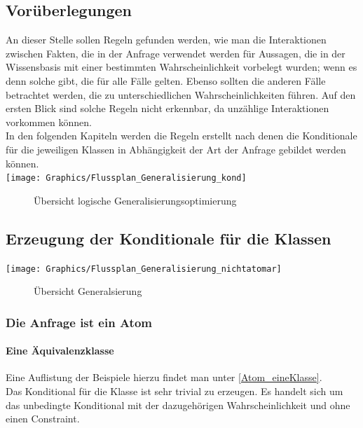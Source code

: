 \documentclass[a4paper, 11pt]{book}
\begin{document}
\subsection{Vorüberlegungen}
An dieser Stelle sollen Regeln gefunden werden, wie man die Interaktionen zwischen Fakten, die in der Anfrage verwendet werden für Aussagen, die in der Wissensbasis mit einer bestimmten Wahrscheinlichkeit vorbelegt wurden; wenn es denn solche gibt, die für alle Fälle gelten. Ebenso sollten die anderen Fälle betrachtet werden, die zu unterschiedlichen Wahrscheinlichkeiten führen. Auf den ersten Blick sind solche Regeln nicht erkennbar, da unzählige Interaktionen vorkommen können.\\
In den folgenden Kapiteln werden die Regeln erstellt nach denen die Konditionale für die jeweiligen Klassen in Abhängigkeit der Art der Anfrage gebildet werden können.\\
\newpage
\texttt{[image: Graphics/Flussplan\_Generalisierung\_kond]}
\begin{figure}[h]
	\caption{Übersicht logische Generalisierungsoptimierung}
	\label{Fig_Log_Genopt}
\end{figure}
\newpage

\subsection{Erzeugung der Konditionale für die Klassen}
\texttt{[image: Graphics/Flussplan\_Generalisierung\_nichtatomar]}
\begin{figure}[h]
	\caption{Übersicht Generalsierung}
	\label{Fig_General}
\end{figure}
\subsubsection {Die Anfrage ist ein Atom} 
\paragraph{ Eine Äquivalenzklasse}
Eine Auflistung der Beispiele hierzu findet man unter \ref{Atom_eineKlasse}.\\
Das Konditional für die Klasse ist sehr trivial zu erzeugen. Es handelt sich um das unbedingte Konditional mit der dazugehörigen Wahrscheinlichkeit und ohne einen Constraint.
\end{document}
